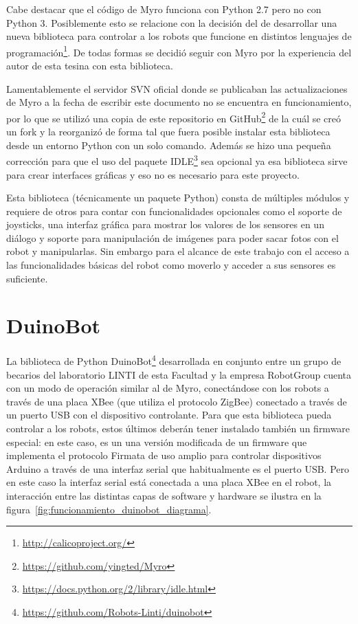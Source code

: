 Cabe destacar que el código de Myro funciona con Python 2.7 pero no con
Python 3. Posiblemente esto se relacione con la decisión del \ipre{}
de desarrollar una nueva biblioteca para controlar a los robots que funcione
en distintos lenguajes de
programación\footnote{\url{http://calicoproject.org/}}. De todas formas se
decidió seguir con Myro por la experiencia del autor de esta tesina
con esta biblioteca.

Lamentablemente el servidor SVN oficial donde se publicaban las
actualizaciones de Myro a la fecha de escribir este documento
no se encuentra en funcionamiento, por lo que se utilizó una
copia de este repositorio en
GitHub\footnote{\url{https://github.com/yingted/Myro}} de la cuál
se creó un fork y la reorganizó de forma tal que fuera posible instalar
esta biblioteca desde un entorno Python con un solo comando.
Además se hizo
una pequeña corrección para que el uso del paquete
IDLE\footnote{\url{https://docs.python.org/2/library/idle.html}}
sea opcional ya esa biblioteca sirve para crear interfaces gráficas
y eso no es necesario para este proyecto.

Esta biblioteca (técnicamente un paquete Python) consta de múltiples
módulos y requiere de otros para contar con funcionalidades opcionales
como el soporte de joysticks, una interfaz gráfica para mostrar
los valores de los sensores en un diálogo y soporte para manipulación
de imágenes para poder sacar fotos con el robot y manipularlas. Sin
embargo para el alcance de este trabajo con el acceso a las funcionalidades
básicas del robot como moverlo y acceder a sus sensores es suficiente.


\section{DuinoBot}\label{sec:duinobot}

La biblioteca de Python
DuinoBot\footnote{\url{https://github.com/Robots-Linti/duinobot}}
desarrollada en conjunto entre un grupo
de becarios del laboratorio LINTI de esta Facultad y la empresa RobotGroup
cuenta con un modo de operación similar al de Myro, conectándose con
los robots a través de una placa XBee (que utiliza el protocolo ZigBee)
conectado a través de un puerto USB con el dispositivo controlante.
Para que esta biblioteca pueda controlar a los robots, estos últimos
deberán tener instalado también un firmware especial: en este caso,
es un una versión modificada de un firmware que implementa el protocolo
Firmata de uso amplio para controlar dispositivos Arduino a través de una
interfaz serial que habitualmente es el puerto USB. Pero en este caso
la interfaz serial está conectada a una placa XBee en el robot,
la interacción
entre las distintas capas de software y hardware se ilustra en la
figura~\ref{fig:funcionamiento_duinobot_diagrama}.

